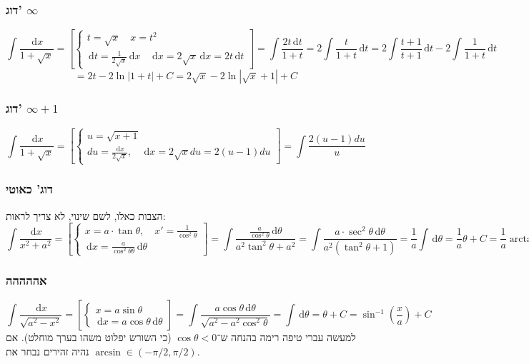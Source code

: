 \documentclass[]{article}
\newcommand\dx    {\,\mathrm{d}x}
\newcommand\dt    {\,\mathrm{d}t}
\newcommand\dtt   {\,\mathrm{d}\theta}
\renewcommand\inf {\infty}
\newcommand\op    {^{-1}}
\newcommand\cl [1]    {\left ( #1 \right )}
\newcommand\csb[1]    {\left [ #1 \right ]}
\begin{document}
	\subsubsection{ דוג' $\inf$}
	\[ \int \frac{\dx}{1 + \sqrt x} = \csb{\begin{cases}
			t = \sqrt x \quad x = t^2 \\
			\dt = \frac{1}{2\sqrt x} \dx \quad \dx = 2 \sqrt{x} \dx = 2t \dt
	\end{cases}} = \int \frac{2t\dt}{1 + t} = 2 \int \frac{t}{1 + t}\dt = 2 \int \frac{t + 1}{t + 1}\dt - 2 \int \frac{1}{ 1 + t}\dt \]
	\[ = 2t - 2 \ln |1 + t| + C = 2 \sqrt{x} - 2 \ln |\sqrt{x} + 1| + C \]
	
	\subsubsection{דוג' $\inf + 1$}
	\[ \int \frac{\dx}{1 + \sqrt x} = \csb{\begin{cases}
			u = \sqrt{x + 1} \\
			du = \frac{\dx}{2 \sqrt x}, \quad \dx = 2 \sqrt{x } du = 2(u - 1) du
	\end{cases}} = \int \frac{2(u - 1)du}{u} \]

	\subsubsection{דוג' כאוטי}
	הצבות כאלו, לשם שינוי, לא צריך לראות: 
	\[ \int \frac{\dx}{x^2 + a^2} = \csb{\begin{cases}
			x = a \cdot \tan \theta, \quad x' = \frac{1}{\cos^2\theta} \\
			\dx = \frac{a}{\cos^2\theta \theta}\dtt
	\end{cases}} = \int \frac{\frac{a}{\cos^2\theta}\dtt}{a^2\tan^2 \theta + a^2} = \int \frac{a \cdot \sec^2 \theta \dtt}{a^2(\tan^2\theta + 1)} = \frac{1}{a}\int \dtt = \frac{1}{a}\theta + C = \frac{1}{a}\arctan\cl{\frac{x}{a}} + C \]

	\subsubsection{אההההה}
	\[ \int \frac{\dx}{\sqrt{a^2 - x^2}} = \csb{\begin{cases}
			x = a \sin \theta \\
			\dx = a \cos \theta \dtt
	\end{cases}} = \int \frac{a \cos \theta \dtt}{\sqrt{a^2 - a^2 \cos^2\theta}} = \int \dtt = \theta + C = \sin\op\cl{\frac{x}{a}} + C \]
	למעשה עברי טיפה רימה בהנחה ש־$\cos \theta < 0$ (כי השורש יפלוט משהו בערך מוחלט). אם נהיה זהירים נבחר את $\arcsin \in (-\pi/2, \pi/2)$. 

	
	
	
	
\end{document}
